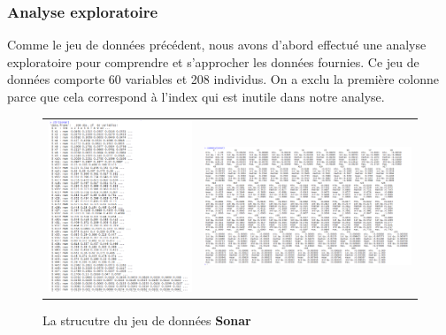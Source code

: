\documentclass[a4paper,11pt,oneside,roman]{article}
\begin{document}
\subsubsection{Analyse exploratoire}
Comme le jeu de données précédent, nous avons d'abord effectué une analyse exploratoire pour comprendre et s'approcher les données fournies. \newline
Ce jeu de données comporte 60 variables et 208 individus. On a exclu la première colonne parce que cela correspond à l'index qui est inutile dans notre analyse.
\begin{figure}[htb]
    \centering
    \begin{tabular}{cc}
    \includegraphics[scale = .5]{./discrimination/Sonar/str.PNG} &
    \includegraphics[scale = .3]{./discrimination/Sonar/summary.PNG}
    \end{tabular}
    \caption{La strucutre du jeu de données \textbf{Sonar}}
    \label{fig:my_label}
\end{figure}
\end{document}
